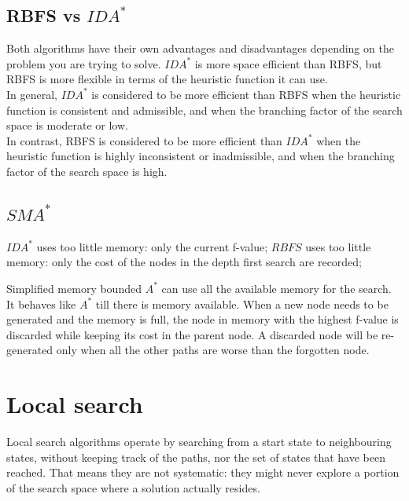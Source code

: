 \documentclass{article}
\begin{document}
\subsection{RBFS vs $IDA^*$}

Both algorithms have their own advantages and disadvantages depending on the problem you are trying to solve. $IDA^*$ is more space efficient than RBFS, but RBFS is more flexible in terms of the heuristic function it can use. \\

In general, $IDA^*$ is considered to be more efficient than RBFS when the heuristic function is consistent and admissible, and when the branching factor of the search space is moderate or low. \\

In contrast, RBFS is considered to be more efficient than $IDA^*$ when the heuristic function is highly inconsistent or inadmissible, and when the branching factor of the search space is high.

\subsection{$SMA^*$}

\begin{center}
    $IDA^*$ uses too little memory: only the current f-value;
    $RBFS$ uses too little memory: only the cost of the nodes in the depth first search are recorded;
\end{center}

Simplified memory bounded $A^*$ can use all the available memory for the search. It behaves like $A^*$ till there is memory available. When a new node needs to be generated and the memory is full, the node in memory with the highest f-value is discarded while keeping its cost in the parent node. A discarded node will be re-generated only when all the other paths are worse than the forgotten node.

\newpage

\section{Local search}

Local search algorithms operate by searching from a start state to neighbouring states, without keeping track of the paths, nor the set of states that have been reached. That means they are not systematic: they might never explore a portion of the search space where a solution actually resides. \\
\end{document}
